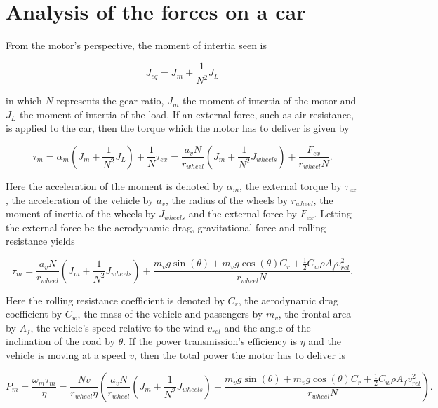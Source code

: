 \documentclass[11pt,titlepage]{report}
\begin{document}
\section{Analysis of the forces on a car}
From the motor's perspective, the moment of intertia seen is

\begin{equation}
	J_{eq} = J_m + \frac{1}{N^2} J_L
\end{equation}

in which $N$ represents the gear ratio, $J_m$ the moment of intertia of the motor and $J_L$ the moment of intertia of the load. If an external force, such as air resistance, is applied to the car, then the torque which the motor has to deliver is given by

\begin{equation} \label{eq:ass-4-eq-torque}
	\tau_{m} = \alpha_m (J_m + \frac{1}{N^2} J_L) + \frac{1}{N} \tau_{ex} =
	\frac{a_v N}{r_{wheel}} (J_m + \frac{1}{N^2} J_{wheels}) + \frac{F_{ex}}{r_{wheel} N}.
\end{equation}

Here the acceleration of the moment is denoted by $\alpha_m$, the external torque by $\tau_{ex}$, the acceleration of the vehicle by $a_v$, the radius of the wheels by $r_{wheel}$, the moment of inertia of the wheels by $J_{wheels}$ and the external force by $F_{ex}$. Letting the external force be the aerodynamic drag, gravitational force and rolling resistance yields

\begin{equation}
	\tau_{m} =
	\frac{a_v N}{r_{wheel}} (J_m + \frac{1}{N^2} J_{wheels}) + \frac{
		m_v g \sin{(\theta)} +
		m_v g \cos{(\theta)} C_r +
		\frac{1}{2} C_w \rho A_f v_{rel}^2
	}{r_{wheel} N}.
\end{equation}

Here the rolling resistance coefficient is denoted by $C_r$, the aerodynamic drag coefficient by $C_w$, the mass of the vehicle and passengers by $m_v$, the frontal area by $A_f$, the vehicle's speed relative to the wind $v_{rel}$ and the angle of the inclination of the road by $\theta$. If the power transmission's efficiency is $\eta$ and the vehicle is moving at a speed $v$, then the total power the motor has to deliver is

\begin{equation} \label{eq:ass-3-driving}
	P_{m} = \frac{\omega_m \tau_{m}}{\eta} =
	\frac{N v}{r_{wheel} \eta} \left(
		\frac{a_v N}{r_{wheel}} (J_m + \frac{1}{N^2} J_{wheels}) + \frac{
			m_v g \sin{(\theta)} +
			m_v g \cos{(\theta)} C_r +
			\frac{1}{2} C_w \rho A_f v_{rel}^2
		}{r_{wheel} N}
	\right).
\end{equation}
\end{document}
